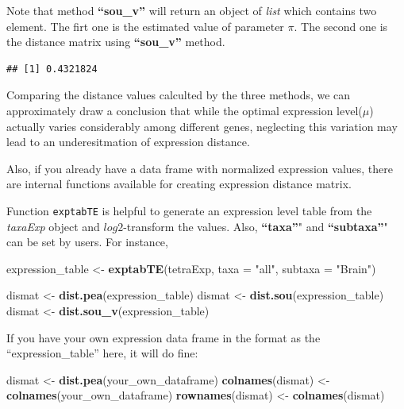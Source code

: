 \documentclass[]{book}
\newenvironment{Shaded}{\begin{snugshade}}{\end{snugshade}}
\newcommand{\DataTypeTok}[1]{\textcolor[rgb]{0.13,0.29,0.53}{#1}}
\newcommand{\KeywordTok}[1]{\textcolor[rgb]{0.13,0.29,0.53}{\textbf{#1}}}
\newcommand{\NormalTok}[1]{#1}
\newcommand{\OperatorTok}[1]{\textcolor[rgb]{0.81,0.36,0.00}{\textbf{#1}}}
\newcommand{\StringTok}[1]{\textcolor[rgb]{0.31,0.60,0.02}{#1}}
\begin{document}
Note that method \textbf{``sou\_v''} will return an object of \emph{list} which contains two element. The firt one is the estimated value of parameter \(\pi\). The second one is the distance matrix using \textbf{``sou\_v''} method.

\begin{Shaded}
\end{Shaded}

\begin{verbatim}
## [1] 0.4321824
\end{verbatim}

Comparing the distance values calculted by the three methods, we can approximately draw a conclusion that while the optimal expression level(\(\mu\)) actually varies considerably among different genes, neglecting this variation may lead to an underesitmation of expression distance.

Also, if you already have a data frame with normalized expression values, there are internal functions available for creating expression distance matrix.

Function \texttt{exptabTE} is helpful to generate an expression level table from the \emph{taxaExp} object and \(log2\)-transform the values. Also, \textbf{``taxa''}" and \textbf{``subtaxa''}" can be set by users.
For instance,

\begin{Shaded}
\begin{Highlighting}[]
\NormalTok{expression_table <-}\StringTok{ }\KeywordTok{exptabTE}\NormalTok{(tetraExp, }\DataTypeTok{taxa =} \StringTok{"all"}\NormalTok{,}
                            \DataTypeTok{subtaxa =} \StringTok{"Brain"}\NormalTok{)}

\NormalTok{dismat <-}\StringTok{ }\KeywordTok{dist.pea}\NormalTok{(expression_table)}
\NormalTok{dismat <-}\StringTok{ }\KeywordTok{dist.sou}\NormalTok{(expression_table)}
\NormalTok{dismat <-}\StringTok{ }\KeywordTok{dist.sou_v}\NormalTok{(expression_table)}
\end{Highlighting}
\end{Shaded}

If you have your own expression data frame in the format as the ``expression\_table'' here, it will do fine:

\begin{Shaded}
\begin{Highlighting}[]
\NormalTok{dismat <-}\StringTok{ }\KeywordTok{dist.pea}\NormalTok{(your_own_dataframe)}
\KeywordTok{colnames}\NormalTok{(dismat) <-}\StringTok{ }\KeywordTok{colnames}\NormalTok{(your_own_dataframe)}
\KeywordTok{rownames}\NormalTok{(dismat) <-}\StringTok{ }\KeywordTok{colnames}\NormalTok{(dismat)}
\end{Highlighting}
\end{Shaded}
\end{document}
